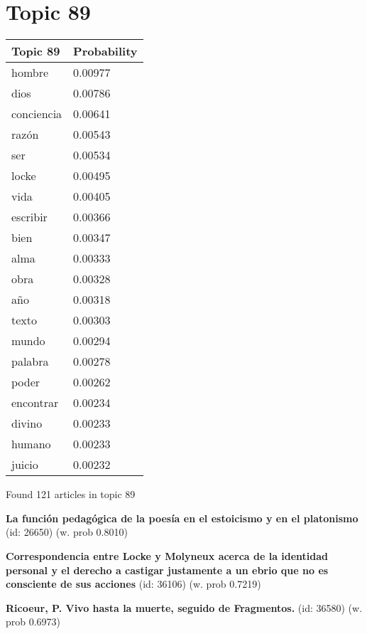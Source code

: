 \documentclass{article}
\begin{document}
\centering
\thispagestyle{empty}
\section*{Topic 89}\vfill
\begin{tabular}{ll}
\toprule
   Topic 89 & Probability \\
\midrule
     hombre &     0.00977 \\
       dios &     0.00786 \\
 conciencia &     0.00641 \\
      razón &     0.00543 \\
        ser &     0.00534 \\
      locke &     0.00495 \\
       vida &     0.00405 \\
   escribir &     0.00366 \\
       bien &     0.00347 \\
       alma &     0.00333 \\
       obra &     0.00328 \\
        año &     0.00318 \\
      texto &     0.00303 \\
      mundo &     0.00294 \\
    palabra &     0.00278 \\
      poder &     0.00262 \\
  encontrar &     0.00234 \\
     divino &     0.00233 \\
     humano &     0.00233 \\
     juicio &     0.00232 \\
\bottomrule
\end{tabular}

\vfill
Found 121 articles in topic 89
\vfill

\textbf{La función pedagógica de la poesía en el estoicismo y en el platonismo} (id: 26650)
 (w. prob 0.8010)
\vfill

\textbf{Correspondencia entre Locke y Molyneux acerca de la identidad personal y el derecho a castigar justamente a un ebrio que no es consciente de sus acciones} (id: 36106)
 (w. prob 0.7219)
\vfill

\textbf{Ricoeur, P. Vivo hasta la muerte, seguido de Fragmentos.} (id: 36580)
 (w. prob 0.6973)

\vfill
\newpage


\centering
\thispagestyle{empty}
\end{document}
